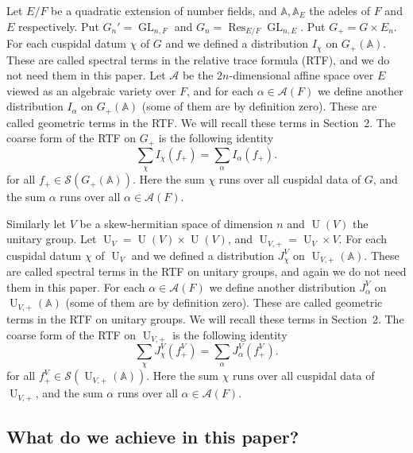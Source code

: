 \documentclass[letterpaper,11pt]{amsart}
\newcommand{\bA}{\mathbb{A}}
\newcommand{\cA}{\mathcal{A}}
\newcommand{\cS}{\mathcal{S}}
\newcommand{\<}{\negthickspace}
\DeclareMathOperator{\GL}{GL}
\DeclareMathOperator{\U}{U}
\DeclareMathOperator{\Res}{Res}
\theoremstyle{definition}
\theoremstyle{plain}
\theoremstyle{remark}
\numberwithin{equation}{section}
\begin{document}
Let $E/F$ be a quadratic extension of number fields, and $\bA, \bA_E$ the adeles of $F$ and $E$ respectively. Put $G_n' = \GL_{n, F}$ and $G_n = \Res_{E/F} \GL_{n, E}$. Put $G_+ = G \times E_n$. For each cuspidal datum $\chi$ of $G$ and we defined a distribution $I_{\chi}$ on $G_+(\bA)$. These are called spectral terms in the relative trace formula (RTF), and we do not need them in this paper. Let $\cA$ be the $2n$-dimensional affine space over $E$ viewed as an algebraic variety over $F$, and for each $\alpha \in \cA(F)$ we define another distribution $I_\alpha$ on $G_+(\bA)$ (some of them are by definition zero). These are called geometric terms in the RTF. We will recall these terms in Section~2. The coarse form of the RTF on $G_+$ is the following identity
    \begin{equation}    \label{eq:coarse_RTF_GL}
    \sum_{\chi} I_{\chi}(f_+) =
    \sum_{\alpha} I_{\alpha}(f_+).
    \end{equation}
for all $f_+ \in \cS(G_+(\bA))$. Here the sum $\chi$ runs over all cuspidal data of $G$, and the sum $\alpha$ runs over all $\alpha \in \cA(F)$.

Similarly let $V$ be a skew-hermitian space of dimension $n$ and $\U(V)$ the unitary group. Let $\U_V = \U(V) \times \U(V)$, and $\U_{V, +} = \U_V \times V$.  For each cuspidal datum $\chi$ of $\U_V$ and we defined a distribution $J_{\chi}^V$ on $\U_{V, +}(\bA)$. These are called spectral terms in the RTF on unitary groups, and again we do not need them in this paper. For each $\alpha \in \cA(F)$ we define another distribution $J_\alpha^V$ on $\U_{V, +}(\bA)$ (some of them are by definition zero). These are called geometric terms in the RTF on unitary groups. We will recall these terms in Section~2. The coarse form of the RTF on $\U_{V, +}$ is the following identity
    \begin{equation}    \label{eq:coarse_RTF_U}
    \sum_{\chi} J_{\chi}^V(f_+^V) =
    \sum_{\alpha} J_{\alpha}^V(f_+^V).
    \end{equation}
for all $f_+^V \in \cS(\U_{V, +}(\bA))$. Here the sum $\chi$ runs over all cuspidal data of $\U_{V, +}$, and the sum $\alpha$ runs over all $\alpha \in \cA(F)$.


\subsection{What do we achieve in this paper?}
\end{document}
